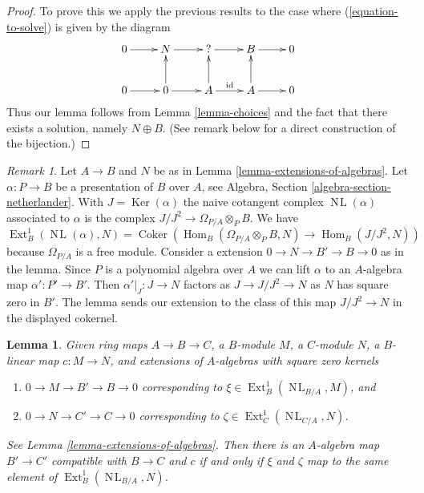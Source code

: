 \documentclass{stacks-project}
\theoremstyle{plain}
\newtheorem{lemma}[subsection]{Lemma}
\theoremstyle{definition}
\theoremstyle{remark}
\newtheorem{remark}[subsection]{Remark}
\numberwithin{equation}{subsection}
\def\Hom{\mathop{\mathrm{Hom}}\nolimits}
\def\Ext{\mathop{\mathrm{Ext}}\nolimits}
\def\NL{\mathop{N\!L}\nolimits}
\def\Ker{\mathop{\mathrm{Ker}}}
\def\Coker{\mathop{\mathrm{Coker}}}
\begin{document}
\begin{proof}
To prove this we apply the previous results to the case where
(\ref{equation-to-solve}) is given by the diagram
$$
\xymatrix{
0 \ar[r] & N \ar[r] & {?} \ar[r] & B \ar[r] & 0 \\
0 \ar[r] & 0 \ar[u] \ar[r] & A \ar[u] \ar[r]^{\text{id}} & A \ar[u] \ar[r] & 0
}
$$
Thus our lemma follows from Lemma \ref{lemma-choices}
and the fact that there exists a solution, namely $N \oplus B$.
(See remark below for a direct construction of the bijection.)
\end{proof}

\begin{remark}
\label{remark-extensions-of-algebras}
Let $A \to B$ and $N$ be as in Lemma \ref{lemma-extensions-of-algebras}.
Let $\alpha : P \to B$ be a presentation of $B$ over $A$, see
Algebra, Section \ref{algebra-section-netherlander}.
With $J = \Ker(\alpha)$ the naive cotangent complex $\NL(\alpha)$
associated to $\alpha$ is the complex $J/J^2 \to \Omega_{P/A} \otimes_P B$.
We have
$$
\Ext^1_B(\NL(\alpha), N) =
\Coker\left(\Hom_B(\Omega_{P/A} \otimes_P B, N) \to \Hom_B(J/J^2, N)\right)
$$
because $\Omega_{P/A}$ is a free module.
Consider a extension $0 \to N \to B' \to B \to 0$ as in the lemma.
Since $P$ is a polynomial algebra over $A$ we can
lift $\alpha$ to an $A$-algebra map $\alpha' : P' \to B'$.
Then $\alpha'|_J : J \to N$ factors as $J \to J/J^2 \to N$
as $N$ has square zero in $B'$. The lemma sends our extension
to the class of this map $J/J^2 \to N$ in the displayed cokernel.
\end{remark}

\begin{lemma}
\label{lemma-extensions-of-algebras-functorial}
Given ring maps $A \to B \to C$, a $B$-module $M$, a $C$-module $N$,
a $B$-linear map $c : M \to N$, and extensions of
$A$-algebras with square zero kernels
\begin{enumerate}
\item[(a)] $0 \to M \to B' \to B \to 0$ corresponding to
$\xi \in \Ext^1_B(\NL_{B/A}, M)$, and
\item[(b)] $0 \to N \to C' \to C \to 0$ corresponding to
$\zeta \in \Ext^1_C(\NL_{C/A}, N)$.
\end{enumerate}
See Lemma \ref{lemma-extensions-of-algebras}.
Then there is an $A$-algebra map $B' \to C'$ compatible with
$B \to C$ and $c$ if and only if $\xi$ and $\zeta$
map to the same element of
$\Ext^1_B(\NL_{B/A}, N)$.
\end{lemma}
\end{document}
